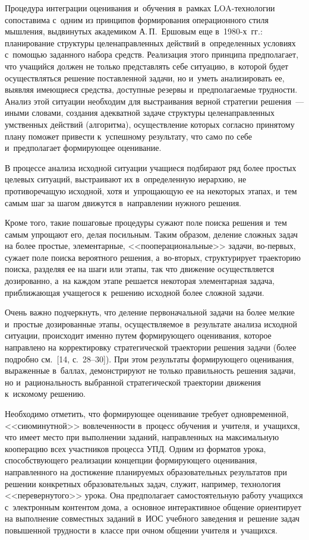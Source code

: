 \begin{multicols}{2}
  Процедура интеграции оценивания и~обучения в~рамках LOA-тех\-но\-ло\-гии сопоставима
с~одним из принципов формирования операционного стиля мышления, выдвинутых
академиком А.\,П.~Ершовым еще в~1980-х~гг.: планирование структуры целенаправленных
действий в~определенных условиях с~помощью заданного набора средств. Реализация этого
принципа предполагает, что учащийся должен не только представлять себе ситуацию, в~которой
будет осуществляться решение поставленной задачи, но и~уметь анализировать ее, выявляя
имеющиеся средства, доступные резервы и~предполагаемые трудности. Анализ этой ситуации
необходим для выстраивания верной стратегии решения~--- иными словами, создания
адекватной задаче структуры целенаправленных умственных действий (алгоритма),
осуществление которых согласно принятому плану поможет привести к~успешному результату,
что само по себе и~предполагает формирующее оценивание.

  В процессе анализа исходной ситуации учащиеся подбирают ряд более простых целевых
ситуаций, выстраивают их в~определенную иерархию, 
не противоречащую исходной, хотя и~упрощающую ее на некоторых этапах, 
и~тем самым шаг за шагом движутся в~направлении
нужного решения.

  Кроме того, такие пошаговые процедуры сужают поле поиска решения и~тем самым
упрощают его, делая посильным. Таким образом, деление сложных задач на более простые,
элементарные, <<пооперациональные>> задачи, во-пер\-вых, сужает поле поиска вероятного
решения, а~во-вто\-рых, структурирует траекторию поиска, разделяя ее на шаги или этапы, так
что движение осуществляется дозированно, а~на каждом этапе решается некоторая
элементарная задача, приближающая учащегося к~решению исходной более сложной задачи.

  Очень важно подчеркнуть, что деление первоначальной задачи на более мелкие и~простые
дозированные этапы, осуществляемое в~результате анализа исходной ситуации, происходит
именно \mbox{путем} формирующего оценивания, которое на\-прав\-ле\-но на корректировку
стратегической траектории решения задачи (более подробно см.~[14, с.~28--30]). При этом
результаты формирующего оценивания, выраженные в~баллах, демонстрируют не только
правильность решения задачи, но и~рациональность выбранной стратегической траектории
движения к~искомому решению.

  Необходимо отметить, что формирующее оценивание требует одновременной,
<<сиюминутной>> вовлеченности в~процесс обучения и~учителя, и~учащихся, что имеет место
при выполнении заданий, направленных на максимальную кооперацию всех участников
процесса УПД. Одним из форматов урока, способствующего реализации концепции
формирующего оценивания, направленного на достижение планируемых образовательных
результатов при решении конкретных образовательных задач, служит, например, технология
<<перевернутого>> урока. Она предполагает самостоятельную работу учащихся с~электронным
контентом дома, а~основное интерактивное общение ориентирует на выполнение совместных
заданий в~ИОС учебного заведения и~решение задач повышенной труд\-ности в~классе при очном
общении учителя и~уча\-щихся.
{ %

}
\end{multicols}
